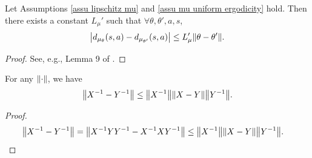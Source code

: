 \documentclass[twoside,11pt]{article}
\numberwithin{assucounter}{section}
\begin{document}
\begin{lemma}
  \label{lem continuity of ergodic distribution}
  Let Assumptions \ref{assu lipschitz mu} and \ref{assu mu uniform ergodicity} hold.
  Then there exists a constant $L_{\mu}'$ such that $\forall \theta, \theta', a, s$,
  \begin{align}
    \abs{d_{\mu_\theta}(s, a) - d_{\mu_{\theta'}}(s, a)} \leq L_\mu' \norm{\theta - \theta'}.
  \end{align}
\end{lemma}
\begin{proof}
  See, e.g., Lemma 9 of \citet{zhang2021breaking}.
\end{proof}

\begin{lemma}
  \label{lem bound of matrix inverse diff}
  For any $\norm{\cdot}$,
  we have
  \begin{align}
    \norm{X^{-1} - Y^{-1}} \leq \norm{X^{-1}} \norm{X-Y} \norm{Y^{-1}}.
  \end{align}
\end{lemma}
\begin{proof}
  \begin{align}
    \norm{X^{-1} - Y^{-1}} &= \norm{X^{-1}YY^{-1} - X^{-1}XY^{-1}} \leq \norm{X^{-1}} \norm{X-Y} \norm{Y^{-1}}.
  \end{align}
\end{proof}
\end{document}
